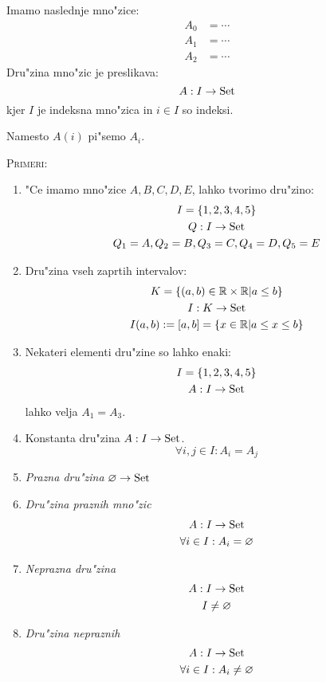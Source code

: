 Imamo naslednje mno"zice:
\begin{align*}
A_0 &= \cdots \\
A_1 &= \cdots \\
A_2 &= \cdots
\end{align*}
Dru"zina mno"zic je preslikava:
\begin{equation*}
A : I \rightarrow \text{Set}
\end{equation*}
kjer $I$ je indeksna mno"zica in $i \in I$ so indeksi.

Namesto $A(i)$ pi"semo $A_i$.

\textsc{Primeri:}
\begin{enumerate}[1)]
	\item "Ce imamo mno"zice $A, B, C, D, E$, lahko tvorimo dru"zino:
	\begin{gather*}
		I = \{1, 2, 3, 4, 5\}\\
		Q : I \rightarrow \text{Set} \\
		Q_1 = A, Q_2 = B, Q_3 = C, Q_4 = D, Q_5 = E
	\end{gather*}
	
	\item Dru"zina vseh zaprtih intervalov:
	\begin{gather*}
		K = \{(a, b) \in \mathbb{R} \times \mathbb{R} | a \leq b\}\\
		I: K \rightarrow \text{Set}\\
		I(a, b) := [a, b] = \{x \in \mathbb{R} | a \leq x \leq b\}
	\end{gather*}
	
	\item Nekateri elementi dru"zine so lahko enaki:
	\begin{gather*}
		I = \{1, 2, 3, 4, 5\} \\
		A : I \rightarrow \text{Set}
	\end{gather*}
	lahko velja $A_1 = A_3$.
	
	\item Konstanta dru"zina $A: I \rightarrow \text{Set}$.
	\begin{equation*}
	\forall i, j \in I: A_i = A_j
	\end{equation*}
	
	\item \emph{Prazna dru"zina} $\varnothing \rightarrow \text{Set}$
	
	\item \emph{Dru"zina praznih mno"zic}
	\begin{gather*}
		A : I \rightarrow \text{Set} \\
		\forall i \in I: A_i = \varnothing
	\end{gather*}
	
	\item \emph{Neprazna dru"zina}
	\begin{gather*}
		A: I \rightarrow \text{Set} \\
		I \neq \varnothing
	\end{gather*}
	
	\item \emph{Dru"zina nepraznih}
	\begin{gather*}
		A : I \rightarrow \text{Set} \\
		\forall i \in I: A_i  \neq \varnothing
	\end{gather*}
\end{enumerate}


